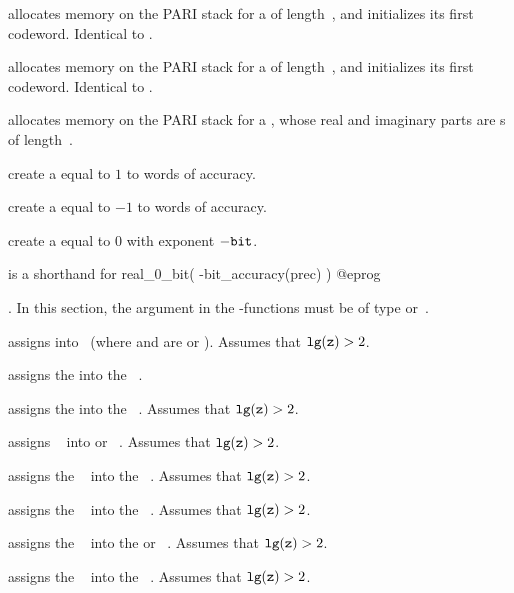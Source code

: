  allocates memory on the PARI stack for a 
of length~, and initializes its first codeword. Identical to
.

 allocates memory on the PARI stack for a 
of length~, and initializes its first codeword. Identical to
.

 allocates memory on the PARI stack for a
, whose real and imaginary parts are s
of length~.

 create a  equal to $1$ to 
words of accuracy.

 create a  equal to $-1$ to 
words of accuracy.

 create a  equal to $0$ with
exponent $-{\tt bit}$.

 is a shorthand for
\bprog
  real_0_bit( -bit_accuracy(prec) )
@eprog

.
In this section, the  argument in the -functions must be of type
 or~.

 assigns  into~ (where 
and  are  or ).
Assumes that ${\tt lg(z)} > 2$.

 assigns the   into the
~.

 assigns the   into the
~. Assumes that ${\tt lg(z)} > 2$.

 assigns ~ into  or
~. Assumes that ${\tt lg(z)} > 2$.

 assigns the ~ into the
~. Assumes that ${\tt lg(z)} > 2$.

 assigns the ~ into the
~. Assumes that ${\tt lg(z)} > 2$.

 assigns the ~ into the
 or ~. Assumes that ${\tt lg(z)} > 2$.

 assigns the ~ into the
~. Assumes that ${\tt lg(z)} > 2$.

